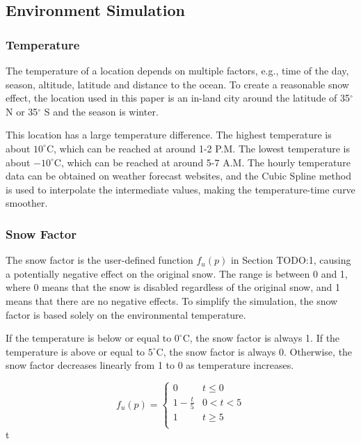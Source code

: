 \documentclass{article}
\begin{document}
\subsection {Environment Simulation}

\subsubsection {Temperature}
The temperature of a location depends on multiple factors, e.g., time of the day, season, altitude, 
latitude and distance to the ocean. To create a reasonable snow effect, the location used in this paper 
is an in-land city around the latitude of 35$^{\circ}$ N or 35$^{\circ}$ S and the season is winter.

This location has a large temperature difference. The highest temperature is about 
\(10^\circ\mathrm{C}\), which can be reached at around 1-2 P.M. The lowest temperature is about 
\(-10^\circ\mathrm{C}\), which can be reached at around 5-7 A.M. The hourly temperature data can be
obtained on weather forecast websites, and the Cubic Spline method is used to interpolate the 
intermediate values, making the temperature-time curve smoother.

\subsubsection {Snow Factor}
The snow factor is the user-defined function \( f_{u}(p) \) in Section TODO:1, causing a potentially 
negative effect on the original snow. The range is between 0 and 1, where 0 means that the snow is 
disabled regardless of the original snow, and 1 means that there are no negative effects.
To simplify the simulation, the snow factor is based solely on the environmental temperature. 

If the temperature is below or equal to \(0^\circ\mathrm{C}\), the snow factor is always 1. 
If the temperature is above or equal to \(5^\circ\mathrm{C}\), the snow factor is always 0. 
Otherwise, the snow factor decreases linearly from 1 to 0 as temperature increases.

\[
  f_{u}(p)=
  \left\{
    \begin{array}{ll}
      0 & t\leq 0 \\
      1 - \frac{t}{5} &  0 < t < 5 \\
      1 & t\geq 5 \\
    \end{array} 
  \right. 
\]
 t 
\end{document}

